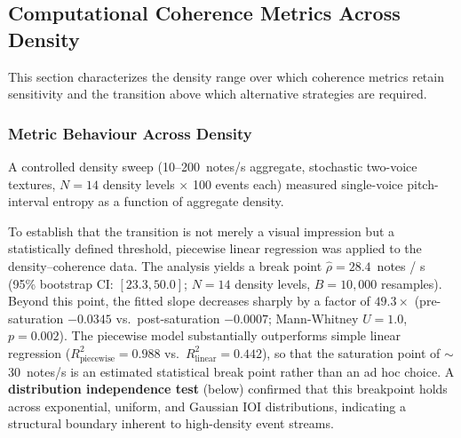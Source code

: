 \documentclass[a4paper]{article}
\theoremstyle{definition}
\theoremstyle{remark}
\begin{document}
\subsection{Computational Coherence Metrics Across Density}
\label{sec:coherence}

This section characterizes the density range over which coherence metrics retain sensitivity and the transition above which alternative strategies are required.

\subsubsection{Metric Behaviour Across Density}
\label{sec:coherence:breakpoint}

A controlled density sweep (10--200~notes/s aggregate, stochastic two-voice textures, $N = 14$ density levels $\times$ 100 events each) measured single-voice pitch-interval entropy as a function of aggregate density.

To establish that the transition is not merely a visual impression but a statistically defined threshold, piecewise linear regression was applied to the density--coherence data. The analysis yields a break point $\hat{\rho} = 28.4$~notes / s (95\% bootstrap CI: $[23.3, 50.0]$; $N = 14$ density levels, $B = 10{,}000$ resamples). Beyond this point, the fitted slope decreases sharply by a factor of $49.3\times$ (pre-saturation $-0.0345$ vs.\ post-saturation $-0.0007$; Mann-Whitney $U = 1.0$, $p = 0.002$). The piecewise model substantially outperforms simple linear regression ($R^2_{\text{piecewise}} = 0.988$ vs.\ $R^2_{\text{linear}} = 0.442$), so that the saturation point of ${\sim}$30~notes/s is an estimated statistical break point rather than an ad hoc choice. A \textbf{distribution independence test} (below) confirmed that this breakpoint holds across exponential, uniform, and Gaussian IOI distributions, indicating a structural boundary inherent to high-density event streams.
\end{document}
